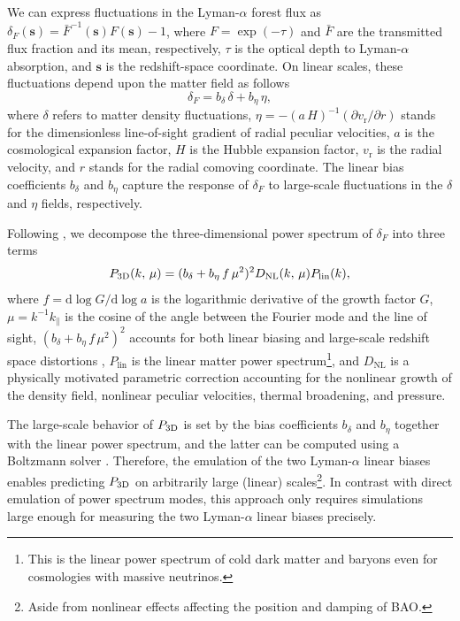 \documentclass[longauth]{aa}
\newcommand{\lya}{Lyman-$\alpha$\xspace}
\newcommand{\lyaf}{Lyman-$\alpha$ forest\xspace}
\newcommand{\pthreed}{\ensuremath{P_{\rm 3D}}\xspace}
\begin{document}
We can express fluctuations in the \lyaf flux as $\delta_F(\mathbf{s}) = \bar{F}^{-1}(\mathbf{s}) F(\mathbf{s})-1$, where $F=\exp(-\tau)$ and $\bar{F}$ are the transmitted flux fraction and its mean, respectively, $\tau$ is the optical depth to \lya absorption, and $\mathbf{s}$ is the redshift-space coordinate. On linear scales, these fluctuations depend upon the matter field as follows \citep[e.g.,][]{mcdonald2003MeasurementCosmologicalGeometry} 
%
\begin{equation}
    \delta_F=b_\delta\, \delta + b_\eta\, \eta,
\end{equation}
%
where $\delta$ refers to matter density fluctuations, $\eta=-(a\,H)^{-1}(\partial v_\mathrm{r}/\partial r)$ stands for the dimensionless line-of-sight gradient of radial peculiar velocities, $a$ is the cosmological expansion factor, $H$ is the Hubble expansion factor, $v_\mathrm{r}$ is the radial velocity, and $r$ stands for the radial comoving coordinate. The linear bias coefficients $b_\delta$ and $b_\eta$ capture the response of $\delta_F$ to large-scale fluctuations in the $\delta$ and $\eta$ fields, respectively. 

Following \citet{mcdonald2003MeasurementCosmologicalGeometry}, we decompose the three-dimensional power spectrum of $\delta_F$ into three terms
%
\begin{equation}
    \label{eq:p3d_model}
    \pthreed(k,\,\mu) = (b_\delta + b_\eta\, f\, \mu^2)^2 D_\mathrm{NL}(k,\,\mu) P_\mathrm{lin}(k),
\end{equation}
%
where $f=\mathrm{d}\log G/\mathrm{d}\log a$ is the logarithmic derivative of the growth factor $G$, $\mu=k^{-1}k_\parallel$ is the cosine of the angle between the Fourier mode and the line of sight, $(b_\delta + b_\eta\, f\, \mu^2)^2$ accounts for both linear biasing and large-scale redshift space distortions \citep{kaiser1987ClusteringRealSpace, mcdonald2000ObservedProbabilityDistribution}, $P_\mathrm{lin}$ is the linear matter power spectrum\footnote{This is the linear power spectrum of cold dark matter and baryons even for cosmologies with massive neutrinos.}, and $D_\mathrm{NL}$ is a physically motivated parametric correction accounting for the nonlinear growth of the density field, nonlinear peculiar velocities, thermal broadening, and pressure.

The large-scale behavior of \pthreed is set by the bias coefficients $b_\delta$ and $b_\eta$ together with the linear power spectrum, and the latter can be computed using a Boltzmann solver \citep[e.g.,][]{lewis2000EfficientComputationCosmic, lesgourgues2011CosmicLinearAnisotropy}. Therefore, the emulation of the two \lya linear biases enables predicting \pthreed on arbitrarily large (linear) scales\footnote{Aside from nonlinear effects affecting the position and damping of BAO.}. In contrast with direct emulation of power spectrum modes, this approach only requires simulations large enough for measuring the two \lya linear biases precisely.
\end{document}
